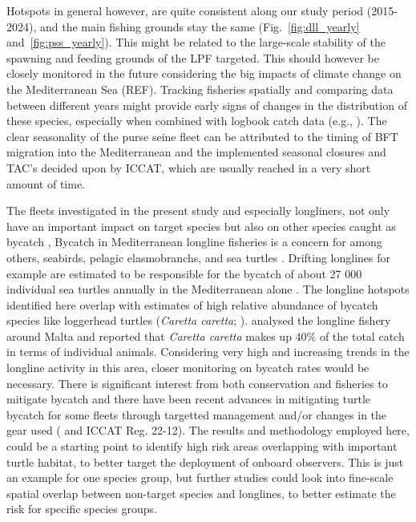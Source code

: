 \medskip

Hotspots in general however, are quite consistent along our study period (2015-2024), and the main
fishing grounds stay the same (Fig.~\ref{fig:dll_yearly} and~\ref{fig:pss_yearly}). This might be
related to the large-scale stability of the spawning and feeding grounds of the LPF targeted. This
should however be closely monitored in the future considering the big impacts of climate change on
the Mediterranean Sea (REF). Tracking fisheries spatially and comparing data between different
years might provide early signs of changes in the distribution of these species, especially when
combined with logbook catch data (e.g., \citealp{campos_ais_logbook}). The clear seasonality of the
purse seine fleet can be attributed to the timing of BFT migration into the Mediterranean and the
implemented seasonal closures and TAC's decided upon by ICCAT, which are usually reached in a very
short amount of time.

\medskip

The fleets investigated in the present study and especially longliners, not only have an important
impact on target species but also on other species caught as bycatch \citep{bycatch_book}, Bycatch
in Mediterranean longline fisheries is a concern for among others, seabirds, pelagic elasmobranchs,
and sea turtles \citep{spain_swo_gear,shark_bycatch,baez_turtles_bycatch}. Drifting longlines for
example are estimated to be responsible for the bycatch of about 27 000 individual sea turtles
annually in the Mediterranean alone \citep{bycatch_book}. The longline hotspots identified here
overlap with estimates of high relative abundance of bycatch species like loggerhead turtles
(\textit{Caretta caretta}; \citealp{dimatteo_turtles}). \cite{bycatch_malta} analysed the longline
fishery around Malta and reported that \textit{Caretta caretta} makes up 40\% of the total catch in
terms of individual animals. Considering very high and increasing trends in the longline activity
in this area, closer monitoring on bycatch rates would be necessary. There is significant interest
from both conservation and fisheries to mitigate bycatch \citep{bycatch_humans} and there have been
recent advances in mitigating turtle bycatch for some fleets through targetted management and/or
changes in the gear used (\citealp{baez_turtles_spain} and ICCAT Reg. 22-12). The results and
methodology employed here, could be a starting point to identify high risk areas overlapping with
important turtle habitat, to better target the deployment of onboard observers. This is just an
example for one species group, but further studies could look into fine-scale spatial overlap
between non-target species and longlines, to better estimate the risk for specific species groups.

